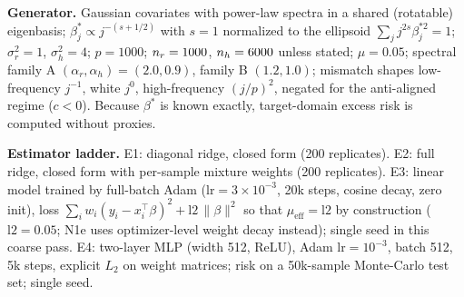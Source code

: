 \textbf{Generator.} Gaussian covariates with power-law spectra in a shared (rotatable) eigenbasis; $\beta^*_j \propto j^{-(s+1/2)}$ with $s=1$ normalized to the ellipsoid $\sum_j j^{2s}\beta_j^{*2}=1$; $\sigma_r^2=1$, $\sigma_h^2=4$; $p=1000$; $n_r=1000$, $n_h=6000$ unless stated; $\mu=0.05$; spectral family A $(\alpha_r,\alpha_h)=(2.0,0.9)$, family B $(1.2,1.0)$; mismatch shapes low-frequency $j^{-1}$, white $j^0$, high-frequency $(j/p)^2$, negated for the anti-aligned regime ($c<0$).
Because $\beta^*$ is known exactly, target-domain excess risk is computed without proxies.

\textbf{Estimator ladder.} E1: diagonal ridge, closed form (200 replicates). E2: full ridge, closed form with per-sample mixture weights (200 replicates). E3: linear model trained by full-batch Adam ($\mathrm{lr}=3\times10^{-3}$, 20k steps, cosine decay, zero init), loss $\sum_i w_i(y_i-x_i^\top\beta)^2 + \mathrm{l2}\,\|\beta\|^2$ so that $\mu_{\mathrm{eff}}=\mathrm{l2}$ by construction ($\mathrm{l2}=0.05$; N1e uses optimizer-level weight decay instead); single seed in this coarse pass. E4: two-layer MLP (width 512, ReLU), Adam $\mathrm{lr}=10^{-3}$, batch 512, 5k steps, explicit $L_2$ on weight matrices; risk on a 50k-sample Monte-Carlo test set; single seed.

